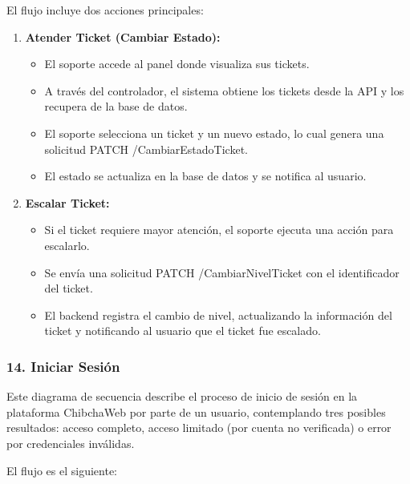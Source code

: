 El flujo incluye dos acciones principales:

\begin{enumerate}
\item \textbf{Atender Ticket (Cambiar Estado):}
\begin{itemize}
    \item El soporte accede al panel donde visualiza sus tickets.
    \item A través del controlador, el sistema obtiene los tickets desde la API y los recupera de la base de datos.
    \item El soporte selecciona un ticket y un nuevo estado, lo cual genera una solicitud PATCH /CambiarEstadoTicket.
    \item El estado se actualiza en la base de datos y se notifica al usuario.
\end{itemize}

\item \textbf{Escalar Ticket:}
\begin{itemize}
\item Si el ticket requiere mayor atención, el soporte ejecuta una acción para escalarlo.
\item Se envía una solicitud PATCH /CambiarNivelTicket con el identificador del ticket.
\item El backend registra el cambio de nivel, actualizando la información del ticket y notificando al usuario que el ticket fue escalado.
\end{itemize}
\end{enumerate}

\subsubsection*{14. Iniciar Sesión}

Este diagrama de secuencia describe el proceso de inicio de sesión en la plataforma ChibchaWeb por parte de un usuario, contemplando tres posibles resultados: acceso completo, acceso limitado (por cuenta no verificada) o error por credenciales inválidas.

El flujo es el siguiente:

